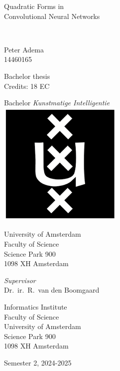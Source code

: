 \documentclass[a4paper, 12pt]{report}
\newcommand{\theTitle}{Quadratic Forms in \\
\vspace{0.5em}
Convolutional Neural Networks}
\newcommand{\theSubTitle}{}
\newcommand{\theAuthor}{Peter Adema}
\newcommand{\theStudentID}{14460165}
\newcommand{\theSupervisor}{Dr.\ ir.\ R.\ van den Boomgaard} %
\newcommand{\theInstitute}{
Informatics Institute \\ %
Faculty of Science\\
University of Amsterdam\\
Science Park 900 \\ 
1098 XH Amsterdam 
}
\newcommand{\theDate}{Semester 2, 2024-2025}
\begin{document}
\pagestyle{empty}
\begin{center}

\vspace{2.5cm}


\begin{Huge}
\theTitle
\end{Huge} \\

\vspace{0.5 cm}

\begin{Large}
\theSubTitle
\end{Large}

\vspace{1.5cm}

\theAuthor\\
\theStudentID

\vspace{1.5cm}

Bachelor thesis\\
Credits: 18 EC

\vspace{0.5cm}

Bachelor \textit{Kunstmatige Intelligentie} \\
\vspace{0.25cm}
\includegraphics[width=0.075\paperwidth]{figures/uva_logo} \\
\vspace{0.1cm}

University of Amsterdam\\
Faculty of Science\\
Science Park 900\\
1098 XH Amsterdam

\vspace{2cm}

\emph{Supervisor}\\

\theSupervisor

\vspace{0.25cm}

\theInstitute

\vspace{1.0cm}

\theDate

\end{center}
\end{document}
